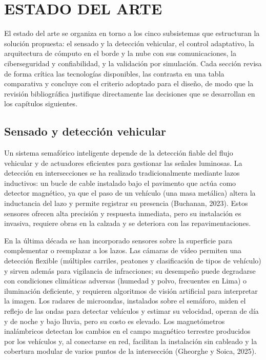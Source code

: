 \chapter{ESTADO DEL ARTE}\label{cap:estado-arte}

El estado del arte se organiza en torno a los cinco subsistemas que estructuran la solución propuesta: el
sensado y la detección vehicular, el control adaptativo, la arquitectura de cómputo en el borde y la nube
con sus comunicaciones, la ciberseguridad y confiabilidad, y la validación por simulación. Cada sección
revisa de forma crítica las tecnologías disponibles, las contrasta en una tabla comparativa y concluye con
el criterio adoptado para el diseño, de modo que la revisión bibliográfica justifique directamente las
decisiones que se desarrollan en los capítulos siguientes.

\section{Sensado y detección vehicular}\label{sec:sensado}

Un sistema semafórico inteligente depende de la detección fiable del flujo vehicular y de actuadores
eficientes para gestionar las señales luminosas. La detección en intersecciones se ha realizado
tradicionalmente mediante lazos inductivos: un bucle de cable instalado bajo el pavimento que actúa como
detector magnético, ya que el paso de un vehículo (una masa metálica) altera la inductancia del lazo y
permite registrar su presencia (Buchanan, 2023). Estos sensores ofrecen alta precisión y respuesta
inmediata, pero su instalación es invasiva, requiere obras en la calzada y se deteriora con las
repavimentaciones.

En la última década se han incorporado sensores sobre la superficie para complementar o reemplazar a los
lazos. Las cámaras de vídeo permiten una detección flexible (múltiples carriles, peatones y clasificación de
tipos de vehículo) y sirven además para vigilancia de infracciones; su desempeño puede degradarse con
condiciones climáticas adversas (humedad y polvo, frecuentes en Lima) o iluminación deficiente, y requieren
algoritmos de visión artificial para interpretar la imagen. Los radares de microondas, instalados sobre el
semáforo, miden el reflejo de las ondas para detectar vehículos y estimar su velocidad, operan de día y de
noche y bajo lluvia, pero su costo es elevado. Los magnetómetros inalámbricos detectan los cambios en el
campo magnético terrestre producidos por los vehículos y, al conectarse en red, facilitan la instalación sin
cableado y la cobertura modular de varios puntos de la intersección (Gheorghe y Soica, 2025).

